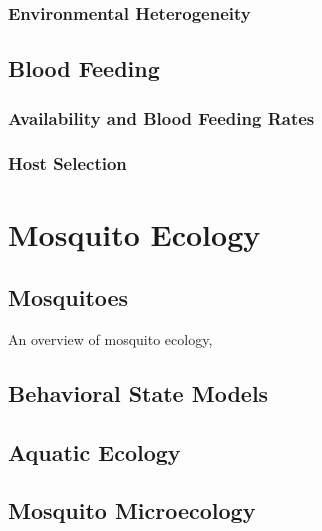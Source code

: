 \documentclass[
]{book}
\begin{document}
\hypertarget{environmentalHeterogeneity}{%
\section{Environmental Heterogeneity}\label{environmentalHeterogeneity}}

\hypertarget{blood-feeding}{%
\chapter{Blood Feeding}\label{blood-feeding}}

\hypertarget{availability-and-blood-feeding-rates}{%
\section{Availability and Blood Feeding Rates}\label{availability-and-blood-feeding-rates}}

\hypertarget{host-selection}{%
\section{Host Selection}\label{host-selection}}

\hypertarget{part-mosquito-ecology}{%
\part{Mosquito Ecology}\label{part-mosquito-ecology}}

\hypertarget{mosquitoes}{%
\chapter{Mosquitoes}\label{mosquitoes}}

An overview of mosquito ecology,

\hypertarget{behavioral-state-models}{%
\chapter{Behavioral State Models}\label{behavioral-state-models}}

\hypertarget{aquatic-ecology}{%
\chapter{Aquatic Ecology}\label{aquatic-ecology}}

\hypertarget{mosquito-microecology}{%
\chapter{Mosquito Microecology}\label{mosquito-microecology}}
\end{document}
